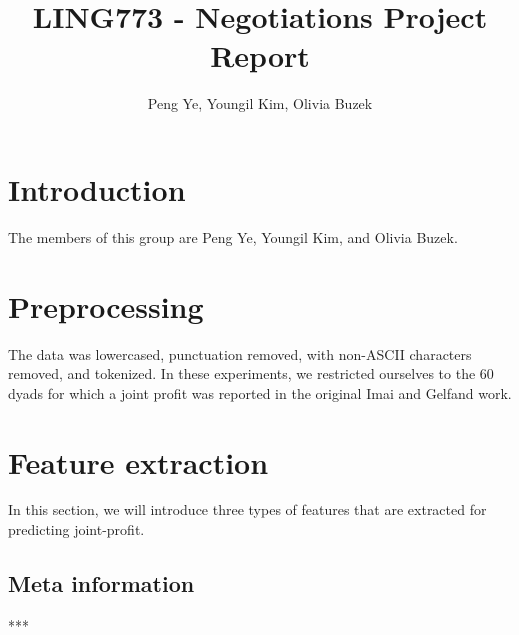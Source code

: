\documentclass[11pt]{article} %
\title{LING773 - Negotiations Project Report}
\author{Peng Ye, Youngil Kim, Olivia Buzek}
\begin{document}
\maketitle


\section{Introduction}

The members of this group are Peng Ye, Youngil Kim, and Olivia Buzek.

\section{Preprocessing}

The data was lowercased, punctuation removed, with non-ASCII characters removed, and tokenized.  In these experiments, we restricted ourselves to the 60 dyads for which a joint profit was reported in the original Imai and Gelfand work.

\section{Feature extraction}
In this section, we will introduce three types of features that are extracted for predicting joint-profit.
\subsection{Meta information}

***
\end{document}

